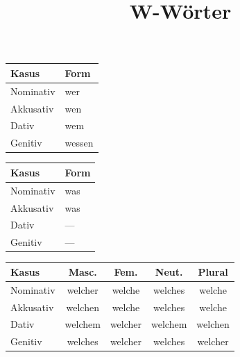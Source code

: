 \documentclass[a4paper]{article}
\title{W-Wörter}
\date{}
\begin{document}
    \maketitle
    \begin{table}[h]
        \centering
        \begin{tabular}{|l|l|}
            \hline
            \textbf{Kasus} & \textbf{Form} \\
            \hline
            Nominativ      & wer           \\
            \hline
            Akkusativ      & wen           \\
            \hline
            Dativ          & wem           \\
            \hline
            Genitiv        & wessen        \\
            \hline
        \end{tabular}
    \end{table}

    \begin{table}[h]
        \centering
        \begin{tabular}{|l|l|}
            \hline
            \textbf{Kasus} & \textbf{Form} \\
            \hline
            Nominativ      & was           \\
            \hline
            Akkusativ      & was           \\
            \hline
            Dativ          & —             \\
            \hline
            Genitiv        & —             \\
            \hline
        \end{tabular}
    \end{table}

    \begin{table}[h]
        \centering
        \begin{tabular}{|l|c|c|c|c|}
            \hline
            \textbf{Kasus} & \textbf{Masc.} & \textbf{Fem.} & \textbf{Neut.} & \textbf{Plural} \\
            \hline
            Nominativ      & welcher        & welche        & welches        & welche          \\
            \hline
            Akkusativ      & welchen        & welche        & welches        & welche          \\
            \hline
            Dativ          & welchem        & welcher       & welchem        & welchen         \\
            \hline
            Genitiv        & welches        & welcher       & welches        & welcher         \\
            \hline
        \end{tabular}
    \end{table}
\end{document}
